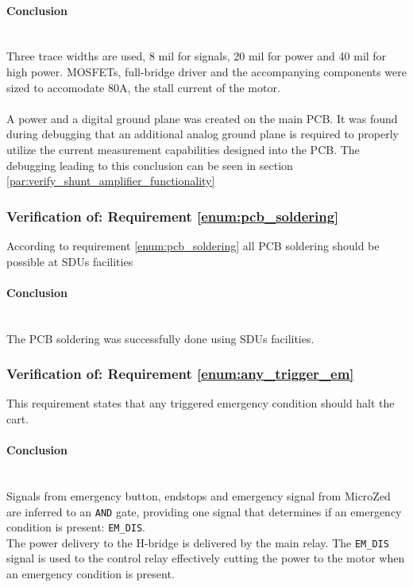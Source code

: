 \paragraph{Conclusion}~\\
Three trace widths are used, 8 mil for signals, 20 mil for power and 40 mil for high power.
MOSFETs, full-bridge driver and the accompanying components were sized to accomodate 80A, the stall current of the motor.
\\~\\
A power and a digital ground plane was created on the main PCB.
It was found during debugging that an additional analog ground plane is required to properly utilize the current measurement capabilities designed into the PCB.
The debugging leading to this conclusion can be seen in section \ref{par:verify_shunt_amplifier_functionality}

\subsubsection{Verification of: Requirement \ref{enum:pcb_soldering}} %
\label{ssub:requirement_enum:pcb_soldering}
According to requirement \ref{enum:pcb_soldering} all PCB soldering should be possible at SDUs facilities
\paragraph{Conclusion}~\\
The PCB soldering was successfully done using SDUs facilities.

\subsubsection{Verification of: Requirement \ref{enum:any_trigger_em}} %
\label{ssub:requirement_enum:any_trigger_em}
This requirement states that any triggered emergency condition should halt the cart.

\paragraph{Conclusion}~\\
Signals from emergency button, endstops and emergency signal from MicroZed are inferred to an \texttt{AND} gate, providing one signal that determines if an emergency condition is present: \texttt{EM\_DIS}.
\\
The power delivery to the H-bridge is delivered by the main relay.
The \texttt{EM\_DIS} signal is used to the control relay effectively cutting the power to the motor when an emergency condition is present.
